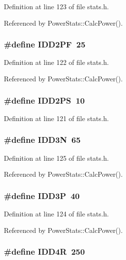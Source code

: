 Definition at line 123 of file stats.h.

Referenced by PowerStats::CalcPower().
\subsubsection[{IDD2PF}]{\setlength{\rightskip}{0pt plus 5cm}\#define IDD2PF~25}\label{stats_8h_43e6e95c5e875592749eb53405c821d0}




Definition at line 122 of file stats.h.

Referenced by PowerStats::CalcPower().
\subsubsection[{IDD2PS}]{\setlength{\rightskip}{0pt plus 5cm}\#define IDD2PS~10}\label{stats_8h_726029c62317a151ec1046a2ddc48fcb}




Definition at line 121 of file stats.h.
\subsubsection[{IDD3N}]{\setlength{\rightskip}{0pt plus 5cm}\#define IDD3N~65}\label{stats_8h_308add993bb6cc0b4a85c178f08b7724}




Definition at line 125 of file stats.h.

Referenced by PowerStats::CalcPower().
\subsubsection[{IDD3P}]{\setlength{\rightskip}{0pt plus 5cm}\#define IDD3P~40}\label{stats_8h_a8796a2d6af26cc54ed02cfa473bc940}




Definition at line 124 of file stats.h.

Referenced by PowerStats::CalcPower().
\subsubsection[{IDD4R}]{\setlength{\rightskip}{0pt plus 5cm}\#define IDD4R~250}\label{stats_8h_d5b1fa999b5a43e0dc1936cc15c99972}




